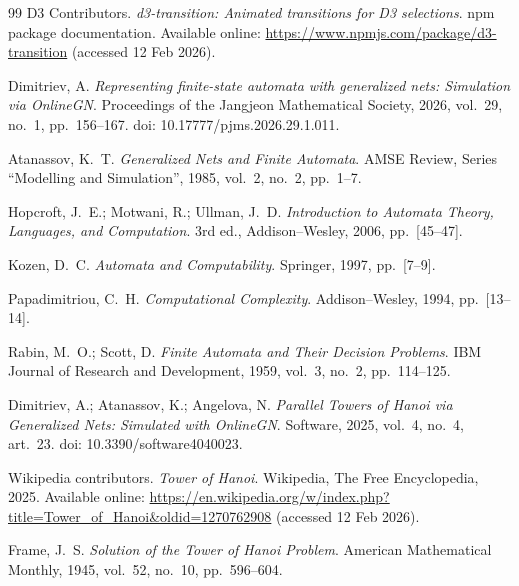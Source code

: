 \begin{thebibliography}{99}
D3 Contributors.
\newblock \emph{d3-transition: Animated transitions for D3 selections}.
\newblock npm package documentation.
\newblock Available online: \url{https://www.npmjs.com/package/d3-transition} (accessed 12 Feb 2026).


Dimitriev, A.
\newblock \emph{Representing finite-state automata with generalized nets: Simulation via OnlineGN}.
\newblock Proceedings of the Jangjeon Mathematical Society, 2026, vol.~29, no.~1, pp.~156--167.
\newblock doi: 10.17777/pjms.2026.29.1.011.

Atanassov, K.~T.
\newblock \emph{Generalized Nets and Finite Automata}.
\newblock AMSE Review, Series ``Modelling and Simulation'', 1985, vol.~2, no.~2, pp.~1--7.

Hopcroft, J.~E.; Motwani, R.; Ullman, J.~D.
\newblock \emph{Introduction to Automata Theory, Languages, and Computation}.
\newblock 3rd ed., Addison--Wesley, 2006, pp.~[45--47].

Kozen, D.~C.
\newblock \emph{Automata and Computability}.
\newblock Springer, 1997, pp.~[7--9].

Papadimitriou, C.~H.
\newblock \emph{Computational Complexity}.
\newblock Addison--Wesley, 1994, pp.~[13--14].

Rabin, M.~O.; Scott, D.
\newblock \emph{Finite Automata and Their Decision Problems}.
\newblock IBM Journal of Research and Development, 1959, vol.~3, no.~2, pp.~114--125.


Dimitriev, A.; Atanassov, K.; Angelova, N.
\newblock \emph{Parallel Towers of Hanoi via Generalized Nets: Simulated with OnlineGN}.
\newblock Software, 2025, vol.~4, no.~4, art.~23.
\newblock doi: 10.3390/software4040023.

Wikipedia contributors.
\newblock \emph{Tower of Hanoi}.
\newblock Wikipedia, The Free Encyclopedia, 2025.
\newblock Available online: \url{https://en.wikipedia.org/w/index.php?title=Tower_of_Hanoi&oldid=1270762908} (accessed 12 Feb 2026).

Frame, J.~S.
\newblock \emph{Solution of the Tower of Hanoi Problem}.
\newblock American Mathematical Monthly, 1945, vol.~52, no.~10, pp.~596--604.


\end{thebibliography}
